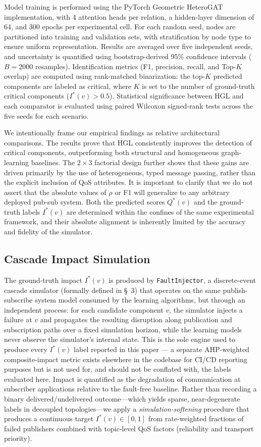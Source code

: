 \documentclass[review]{elsarticle}
\begin{document}
Model training is performed using the PyTorch Geometric HeteroGAT implementation, with 4 attention
heads per relation, a hidden-layer dimension of 64, and 300 epochs per experimental cell. For each
random seed, nodes are partitioned into training and validation sets, with stratification by node
type to ensure uniform representation. Results are averaged over five independent seeds, and
uncertainty is quantified using bootstrap-derived 95\% confidence intervals ($B=2000$ resamples).
Identification metrics (F1, precision, recall, and Top-$K$ overlap) are computed using
rank-matched binarization: the top-$K$ predicted components are labeled as critical, where $K$ is
set to the number of ground-truth critical components ($I^*(v)>0.5$). Statistical significance
between HGL and each comparator is evaluated using paired Wilcoxon signed-rank tests across the
five seeds for each scenario.

We intentionally frame our empirical findings as relative architectural comparisons. The results
prove that HGL consistently improves the detection of critical components, outperforming both
structural and homogeneous graph-learning baselines. The $2\times3$ factorial design further shows
that these gains are driven primarily by the use of heterogeneous, typed message passing, rather
than the explicit inclusion of QoS attributes. It is important to clarify that we do not assert
that the absolute values of $\rho$ or F1 will generalize to any arbitrary deployed pub-sub system.
Both the predicted scores $Q^*(v)$ and the ground-truth labels $I^*(v)$ are determined within the
confines of the same experimental framework, and their absolute alignment is inherently limited by
the accuracy and fidelity of the simulator.

\subsection{Cascade Impact Simulation}

The ground-truth impact $I^*(v)$ is produced by \texttt{FaultInjector}, a discrete-event cascade
simulator (formally defined in \S~3) that operates on the same publish-subscribe system model
consumed by the learning algorithms, but through an independent process: for each candidate
component $v$, the simulator injects a failure at $v$ and propagates the resulting disruption along
publication and subscription paths over a fixed simulation horizon, while the learning models never
observe the simulator's internal state. This is the sole engine used to produce every $I^*(v)$
label reported in this paper --- a separate AHP-weighted composite-impact metric exists elsewhere
in the codebase for CI/CD reporting purposes but is not used for, and should not be conflated with,
the labels evaluated here. Impact is quantified as the degradation of communication at subscriber
applications relative to the fault-free baseline. Rather than recording a binary
delivered/undelivered outcome---which yields sparse, near-degenerate labels in decoupled
topologies---we apply a \emph{simulation-softening} procedure that produces a continuous target
$I^*(v)\in[0,1]$ from rate-weighted fractions of failed publishers combined with topic-level QoS
factors (reliability and transport priority).
\end{document}
